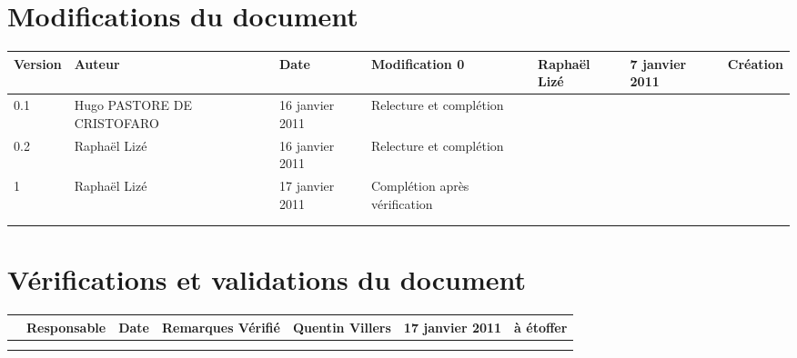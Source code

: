 
\section*{Modifications du document}

\begin{center}
\begin{longtable}{|m{14mm}||m{36mm}|m{36mm}|m{60mm}|}
\hline
Version & Auteur & Date & Modification\endhead \hline
0
& %
Raphaël Lizé
& %
7 janvier 2011
& %
Création
\\\hline
0.1
& %
Hugo PASTORE DE CRISTOFARO
& %
16 janvier 2011
& %
Relecture et complétion
\\\hline
0.2
& %
Raphaël Lizé
& %
16 janvier 2011
& %
Relecture et complétion
\\\hline
1
& %
Raphaël Lizé
& %
17 janvier 2011
& %
Complétion après vérification
\\\hline

& %

& %

& %

\\\hline

& %

& %

& %

\\\hline
\end{longtable}
\end{center}


\section*{Vérifications et validations du document}

\begin{center}
\begin{longtable}{|m{15mm}|m{36mm}|m{36mm}|m{60mm}|}
\hline
 & Responsable & Date & Remarques\endhead \hline
Vérifié
& %
Quentin Villers
& %
17 janvier 2011
& %
à  étoffer
\\\hline

& %

& %

& %

\\\hline

& %

& %

& %

\\\hline
\end{longtable}
\end{center}

\pagebreak
